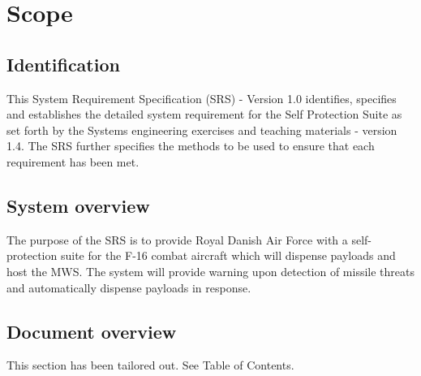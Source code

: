 \documentclass[Main]{subfiles}
\begin{document}
\chapter{Scope}

\section{Identification}
This System Requirement Specification (SRS) - Version 1.0 identifies, specifies and establishes the detailed system requirement for the Self Protection Suite as set forth by the Systems engineering exercises and teaching materials - version 1.4.
The SRS further specifies the methods to be used to ensure that each requirement has been met. 

\section{System overview}
The purpose of the SRS is to provide Royal Danish Air Force with a self-protection suite for the F-16 combat aircraft which will dispense payloads and host the MWS. 
The system will provide warning upon detection of missile threats and automatically dispense payloads in response.

\section{Document overview}
This section has been tailored out. See Table of Contents.
\end{document}
